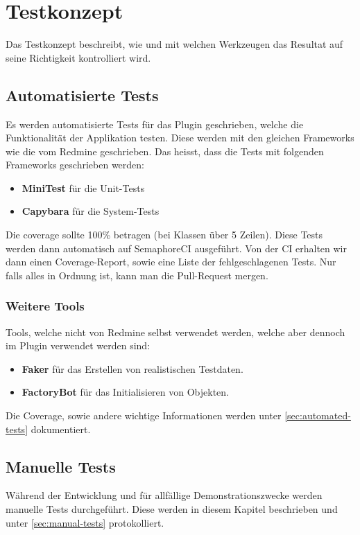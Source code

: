 \section{Testkonzept}
\label{sec:testkonzept}
Das Testkonzept beschreibt, wie und mit welchen Werkzeugen das Resultat auf seine Richtigkeit kontrolliert wird.

\subsection{Automatisierte Tests}
Es werden automatisierte Tests für das Plugin geschrieben, welche die Funktionalität der Applikation testen.
Diese werden mit den gleichen Frameworks wie die vom Redmine geschrieben. Das heisst, dass die Tests mit
folgenden Frameworks geschrieben werden:
\begin{itemize}
  \item \textbf{MiniTest} für die Unit-Tests
  \item \textbf{Capybara} für die System-Tests
\end{itemize}
Die coverage sollte 100\% betragen (bei Klassen über 5 Zeilen). Diese Tests werden dann automatisch auf 
SemaphoreCI ausgeführt. Von der CI erhalten wir dann einen Coverage-Report, sowie eine Liste der
fehlgeschlagenen Tests. Nur falls alles in Ordnung ist, kann man die Pull-Request mergen.
\subsubsection{Weitere Tools}
Tools, welche nicht von Redmine selbst verwendet werden, welche aber dennoch im Plugin verwendet werden sind:
\begin{itemize}
  \item \textbf{Faker} für das Erstellen von realistischen Testdaten.
  \item \textbf{FactoryBot} für das Initialisieren von Objekten.
\end{itemize}
Die Coverage, sowie andere wichtige Informationen werden unter \ref{sec:automated-tests} dokumentiert.

\subsection{Manuelle Tests}
Während der Entwicklung und für allfällige Demonstrationszwecke werden manuelle Tests durchgeführt. Diese
werden in diesem Kapitel beschrieben und unter \ref{sec:manual-tests} protokolliert.

